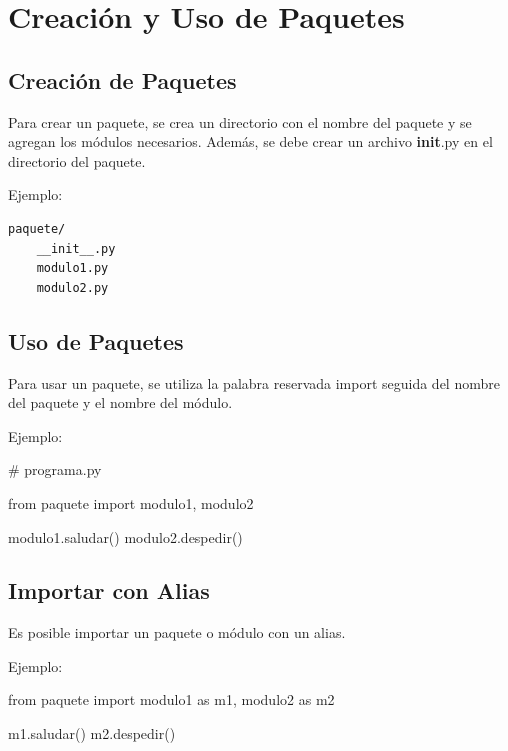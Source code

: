 \documentclass[
  a4paper,
  DIV=11,
  numbers=noendperiod,
  onepage,
  openany]{scrreprt}
\newenvironment{Shaded}{\begin{snugshade}}{\end{snugshade}}
\newcommand{\CommentTok}[1]{\textcolor[rgb]{0.37,0.37,0.37}{#1}}
\newcommand{\ImportTok}[1]{\textcolor[rgb]{0.00,0.46,0.62}{#1}}
\newcommand{\NormalTok}[1]{\textcolor[rgb]{0.00,0.23,0.31}{#1}}
\begin{document}
\chapter{Creación y Uso de
Paquetes}\label{creaciuxf3n-y-uso-de-paquetes}

\section{Creación de Paquetes}\label{creaciuxf3n-de-paquetes}

Para crear un paquete, se crea un directorio con el nombre del paquete y
se agregan los módulos necesarios. Además, se debe crear un archivo
\textbf{init}.py en el directorio del paquete.

Ejemplo:

\begin{verbatim}
paquete/
    __init__.py
    modulo1.py
    modulo2.py
\end{verbatim}

\section{Uso de Paquetes}\label{uso-de-paquetes}

Para usar un paquete, se utiliza la palabra reservada import seguida del
nombre del paquete y el nombre del módulo.

Ejemplo:

\begin{Shaded}
\begin{Highlighting}[]
\CommentTok{\# programa.py}

\ImportTok{from}\NormalTok{ paquete }\ImportTok{import}\NormalTok{ modulo1, modulo2}

\NormalTok{modulo1.saludar()}
\NormalTok{modulo2.despedir()}
\end{Highlighting}
\end{Shaded}

\section{Importar con Alias}\label{importar-con-alias-1}

Es posible importar un paquete o módulo con un alias.

Ejemplo:

\begin{Shaded}
\begin{Highlighting}[]

\ImportTok{from}\NormalTok{ paquete }\ImportTok{import}\NormalTok{ modulo1 }\ImportTok{as}\NormalTok{ m1, modulo2 }\ImportTok{as}\NormalTok{ m2}

\NormalTok{m1.saludar()}
\NormalTok{m2.despedir()}
\end{Highlighting}
\end{Shaded}
\end{document}
